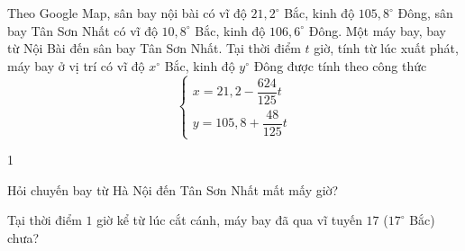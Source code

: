 \begin{baitap}%
	Theo Google Map, sân bay nội bài có vĩ độ $ 21,2^\circ $ Bắc, kinh độ $ 105,8^\circ $ Đông, sân bay Tân Sơn Nhất có vĩ độ $ 10,8^\circ $ Bắc, kinh độ $ 106,6^\circ $ Đông. Một máy bay, bay từ Nội Bài đến sân bay Tân Sơn Nhất. Tại thời điểm $ t$ giờ, tính từ lúc xuất phát, máy bay ở vị trí có vĩ độ $ x^\circ $ Bắc, kinh độ $ y^\circ $ Đông được tính theo công thức
	$$\left\{\begin{array}{l}
		x=21,2-\dfrac{624}{125}t\\
		y=105,8+\dfrac{48}{125}t
	\end{array}\right.$$
\begin{enumEX}[a)]{1}
	\item Hỏi chuyến bay từ Hà Nội đến Tân Sơn Nhất mất mấy giờ?
	\item Tại thời điểm $ 1$ giờ kể từ lúc cắt cánh, máy bay đã qua vĩ tuyến $ 17$ ($ 17^\circ $ Bắc) chưa?
\end{enumEX}
\end{baitap}


